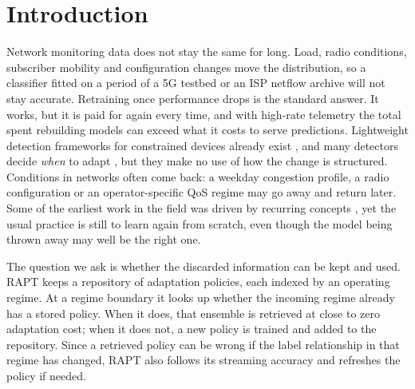 \documentclass[conference]{IEEEtran}
\begin{document}
\section{Introduction}
Network monitoring data does not stay the same for long. Load, radio conditions,
subscriber mobility and configuration changes move the distribution, so a classifier
fitted on a period of a 5G testbed or an ISP netflow archive will not stay accurate.
Retraining once performance drops is the standard answer. It works, but it is paid for
again every time, and with high-rate telemetry the total spent rebuilding models can
exceed what it costs to serve predictions. Lightweight detection frameworks for
constrained devices already exist \cite{9427288}, and many detectors decide \emph{when}
to adapt
\cite{bifet2007learning,page1954continuous,gama2004learning,baena2006early,ross2012exponentially,dos2016fast,brockhoff2020time},
but they make no use of how the change is structured. Conditions in networks often come
back: a weekday congestion profile, a radio configuration or an operator-specific QoS
regime may go away and return later. Some of the earliest work in the field was driven by
recurring concepts \cite{schlimmer1986incremental,widmer1994combining}, yet the usual
practice is still to learn again from scratch, even though the model being thrown away
may well be the right one.

The question we ask is whether the discarded information can be kept and used. RAPT keeps
a repository of adaptation policies, each indexed by an operating regime. At a regime
boundary it looks up whether the incoming regime already has a stored policy. When it
does, that ensemble is retrieved at close to zero adaptation cost; when it does not, a
new policy is trained and added to the repository. Since a retrieved policy can be wrong
if the label relationship in that regime has changed, RAPT also follows its streaming
accuracy and refreshes the policy if needed.
\end{document}
